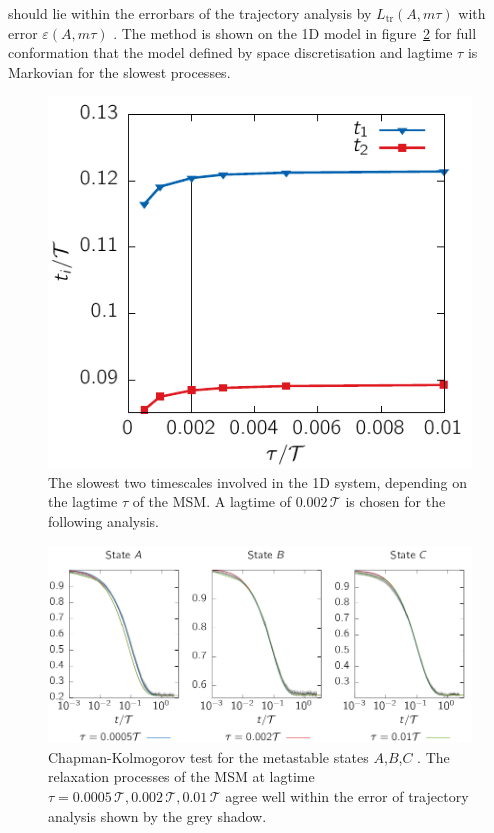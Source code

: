 should lie within the errorbars of the trajectory analysis by $L_{\text{tr}}(A,m\tau)$ with error $ \varepsilon(A,m\tau)$  . The method is shown on the 1D model in figure~\ref{fig:Cktest} for full conformation that the model defined by space discretisation and lagtime $\tau$ is Markovian for the slowest processes.
\begin{figure}
\centering
 \includegraphics{../plots/MSM/lagtime_2010.pdf}
\caption[Two slowest timescales for the 1D driven system depending on lagtime.]{The slowest two timescales involved in the 1D system, depending on
the lagtime $\tau$ of the MSM. A lagtime of $0.002\,\mathcal{T}$ is chosen for the following analysis. }
\label{fig:lagtime}
\end{figure}

\begin{figure}
\centering
 \includegraphics{../plots/MSM/cktest_2010.pdf}
\caption[Chapman-Kolmogorov test for the metastable states for the 1D driven system.]{Chapman-Kolmogorov test for the metastable states $A$,$B$,$C$ . The relaxation processes of the MSM at lagtime $\tau=0.0005\,\mathcal{T},0.002\,\mathcal{T},0.01\,\mathcal{T}$ agree well within the error of trajectory analysis shown by the grey shadow. }
\label{fig:Cktest}
\end{figure}


